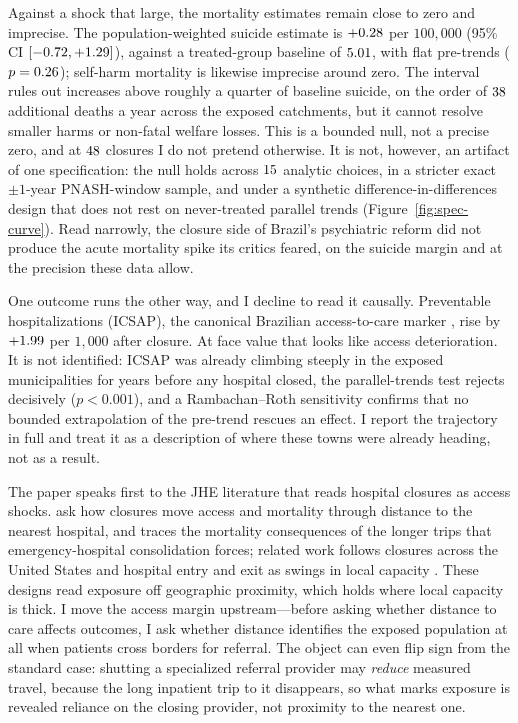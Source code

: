 Against a shock that large, the mortality estimates remain close to zero
and imprecise. The population-weighted suicide estimate is
$+0.28$ per $100{,}000$ (95\% CI $[-0.72, +1.29]$),
against a treated-group baseline of $5.01$, with flat
pre-trends ($p = 0.26$); self-harm mortality is likewise
imprecise around zero. The interval rules out increases above roughly a
quarter of baseline suicide, on the order of $38$ additional
deaths a year across the exposed catchments, but it cannot resolve smaller
harms or non-fatal welfare losses. This is a bounded null, not a precise
zero, and at $48$ closures I do not pretend otherwise. It
is not, however, an artifact of one specification: the null holds across
$15$ analytic choices, in a stricter exact $\pm 1$-year
PNASH-window sample, and under a synthetic difference-in-differences design
that does not rest on never-treated parallel trends
(Figure~\ref{fig:spec-curve}). Read narrowly, the closure
side of Brazil's psychiatric reform did not produce the acute mortality
spike its critics feared, on the suicide margin and at the precision these
data allow.

One outcome runs the other way, and I decline to read it causally.
Preventable hospitalizations (ICSAP), the canonical Brazilian
access-to-care marker \citep{macinkoHarris2015, rochaSoares2010}, rise by
$+1.99$ per $1{,}000$ after closure. At face value that looks like
access deterioration. It is not identified: ICSAP was already climbing
steeply in the exposed municipalities for years before any hospital
closed, the parallel-trends test rejects decisively ($p < 0.001$), and a
Rambachan--Roth sensitivity confirms that no bounded extrapolation of the
pre-trend rescues an effect. I report the trajectory in full and treat it
as a description of where these towns were already heading, not as a
result.

The paper speaks first to the JHE literature that reads hospital closures
as access shocks. \citet{buchmueller2006} ask how closures move access and
mortality through distance to the nearest hospital, and \citet{avdic2016}
traces the mortality consequences of the longer trips that emergency-hospital
consolidation forces; related work follows closures across the United States
\citep{carroll2019, joynt2015, gujralBasu2019, lindrooth2018} and hospital
entry and exit as swings in local capacity \citep{petek2022}. These designs
read exposure off geographic proximity, which holds where local capacity is
thick. I move the access margin upstream---before asking whether distance to
care affects outcomes, I ask whether distance identifies the exposed
population at all when patients cross borders for referral. The object can
even flip sign from the standard case: shutting a specialized referral
provider may \emph{reduce} measured travel, because the long inpatient trip
to it disappears, so what marks exposure is revealed reliance on the closing
provider, not proximity to the nearest one.

